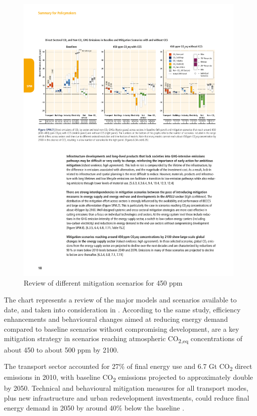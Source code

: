 \begin{figure}[ht]
  \centering
  \includegraphics[width=\textwidth]{figures/introduction/mitigation_scenarios.pdf}
  \caption{Review of different mitigation scenarios for 450 ppm \label{fig:mitigationscenarios}}
\end{figure}

The chart represents a review of the major models and scenarios available to date, and taken into consideration in \cite{IPCC2014}. According to the same study, efficiency enhancements and behavioural changes aimed at reducing energy demand compared to baseline scenarios without compromising development, are a key mitigation strategy in scenarios reaching atmospheric CO\textsubscript{2,eq} concentrations of about 450 to about 500 ppm by 2100.

The transport sector accounted for 27\% of final energy use and 6.7 Gt CO\textsubscript{2} direct emissions in 2010, with baseline CO\textsubscript{2} emissions projected to approximately double by 2050. Technical and behavioural mitigation measures for all transport modes, plus new infrastructure and urban redevelopment investments, could reduce final energy demand in 2050 by around 40\% below the baseline \cite{IPCC2014}.

